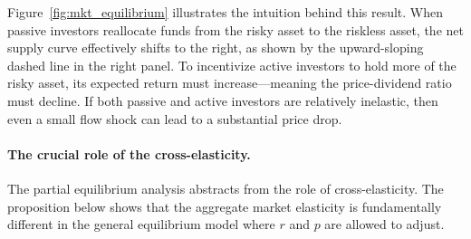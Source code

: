 Figure~\ref{fig:mkt_equilibrium} illustrates the intuition behind this result. When passive investors reallocate funds from the risky asset to the riskless asset, the net supply curve effectively shifts to the right, as shown by the upward-sloping dashed line in the right panel. To incentivize active investors to hold more of the risky asset, its expected return must increase---meaning the price-dividend ratio must decline. If both passive and active investors are relatively inelastic, then even a small flow shock can lead to a substantial price drop.%


\paragraph{The crucial role of the cross-elasticity.} The partial equilibrium analysis abstracts from the role of cross-elasticity. 
The proposition below shows that the aggregate market elasticity is fundamentally different in the general equilibrium model where $r$ and $p$ are allowed to adjust. 

